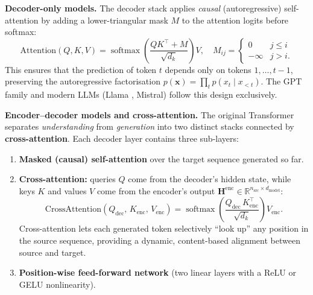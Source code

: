 \documentclass[11pt,a4paper]{article}
\DeclareMathOperator{\softmax}{softmax}
\begin{document}
	\textbf{Decoder-only models.} The decoder stack applies \emph{causal} (autoregressive) self-attention by adding a lower-triangular mask $M$ to the attention logits before softmax:
	\begin{equation}
		\mathrm{Attention}(Q, K, V) = \softmax\!\left(\frac{QK^\top + M}{\sqrt{d_k}}\right) V,
		\quad M_{ij} = \begin{cases} 0 & j \le i \\ -\infty & j > i. \end{cases}
	\end{equation}
	This ensures that the prediction of token $t$ depends only on tokens $1,\ldots,t{-}1$, preserving the autoregressive factorisation $p(\mathbf{x}) = \prod_{t} p(x_t \mid x_{<t})$. The GPT family \parencite{radford2018, brown2020} and modern LLMs (Llama \parencite{dubey2024}, Mistral) follow this design exclusively.

	\textbf{Encoder--decoder models and cross-attention.} The original Transformer \parencite{vaswani2017} separates \emph{understanding} from \emph{generation} into two distinct stacks connected by \textbf{cross-attention}. Each decoder layer contains three sub-layers:
	\begin{enumerate}[nosep]
		\item \textbf{Masked (causal) self-attention} over the target sequence generated so far.
		\item \textbf{Cross-attention:} queries $Q$ come from the decoder's hidden state, while keys $K$ and values $V$ come from the encoder's output $\mathbf{H}^{\mathrm{enc}} \in \mathbb{R}^{n_{\mathrm{src}} \times d_{\mathrm{model}}}$:
		\begin{equation}
			\mathrm{CrossAttention}(Q_{\mathrm{dec}},\, K_{\mathrm{enc}},\, V_{\mathrm{enc}}) = \softmax\!\left(\frac{Q_{\mathrm{dec}}\,K_{\mathrm{enc}}^\top}{\sqrt{d_k}}\right) V_{\mathrm{enc}}.
		\end{equation}
		Cross-attention lets each generated token selectively ``look up'' any position in the source sequence, providing a dynamic, content-based alignment between source and target.
		\item \textbf{Position-wise feed-forward network} (two linear layers with a ReLU or GELU nonlinearity).
	\end{enumerate}
\end{document}
